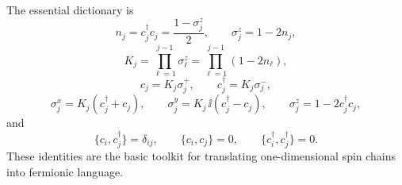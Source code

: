 The essential dictionary is
\begin{equation}
    n_j
    =
    c_j^\dagger c_j
    =
    \frac{1-\sigma_j^z}{2},
    \qquad
    \sigma_j^z=1-2n_j,
\end{equation}
\begin{equation}
    K_j
    =
    \prod_{\ell=1}^{j-1}\sigma_\ell^z
    =
    \prod_{\ell=1}^{j-1}(1-2n_\ell),
\end{equation}
\begin{equation}
    c_j=K_j\sigma_j^+,
    \qquad
    c_j^\dagger=K_j\sigma_j^-,
\end{equation}
\begin{equation}
    \sigma_j^x=K_j(c_j^\dagger+c_j),
    \qquad
    \sigma_j^y=K_j\,\ii(c_j^\dagger-c_j),
    \qquad
    \sigma_j^z=1-2c_j^\dagger c_j,
\end{equation}
and
\begin{equation}
    \{c_i,c_j^\dagger\}=\delta_{ij},
    \qquad
    \{c_i,c_j\}=0,
    \qquad
    \{c_i^\dagger,c_j^\dagger\}=0.
\end{equation}
These identities are the basic toolkit for translating one-dimensional spin chains
into fermionic language.